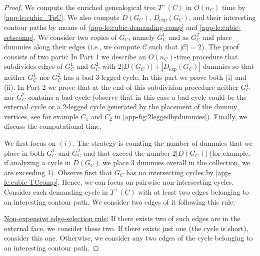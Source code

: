 \documentclass[runningheads]{llncs}
\begin{document}
\begin{proof}
We compute the enriched genealogical tree $T^+(C)$ in $O(n_C)$ time by \cref{app-le:cubic_TpC}. We also compute $D(G_C)$, $D_{\exp}(G_C)$, and their interesting contour paths by means of~\cref{app-le:cubic-demanding-comp} and \cref{app-le:cubic-setscomp}. We consider two copies of $G_C$, namely $G^1_C$ and as $G^2_C$ and place dummies along their edges (i.e., we compute $\mathcal{C}$ such that $|\mathcal{C}|=2$).
The proof consists of two parts: In Part 1 we describe an  $O(n_C)$-time procedure that subdivides edges of $G^1_C$ and $G^2_C$ with $2|D(G_C)|+|D_{\exp}(G_C)|$ dummies so that neither $G^1_C$ nor $G^2_C$ has a bad $3$-legged cycle. In this part we prove both (i) and (ii). In Part 2 we prove that at the end of this subdivision procedure neither $G^1_C$ nor $G^2_C$ contains a bad cycle (observe that in this case a bad cycle could be the external cycle or a 2-legged cycle generated by the placement of the dummy vertices, see for example $C_1$ and $C_2$ in \cref{app-fig:2leggedbydummies}). Finally, we discuss the computational time.


\smallskip {} We first focus on $(i)$.
The strategy is counting the number of dummies that we place in both $G^1_C$ and $G^2_C$ and that exceed the number $2|D(G_C)|$ (for example, if analyzing a cycle in $D(G_C)$ we place 3 dummies overall in the collection, we are exceeding 1).  Observe first that $G_C$ has no intersecting cycles by \cref{app-le:cubic-TCcomp}. Hence, we can focus on pairwise non-intersecting cycles. Consider each demanding cycle in $T^+(C)$ with at least two edges belonging to an interesting contour path. We consider two edges of it following this rule:

\smallskip
\noindent
\underline{Non-expensive edge-selection rule}: If there exists two of such edges are in the external face, we consider these two. If there exists just one (the cycle is short), consider this one. Otherwise, we consider any two edges of the cycle belonging to an interesting contour path. 


\end{proof}
\end{document}
